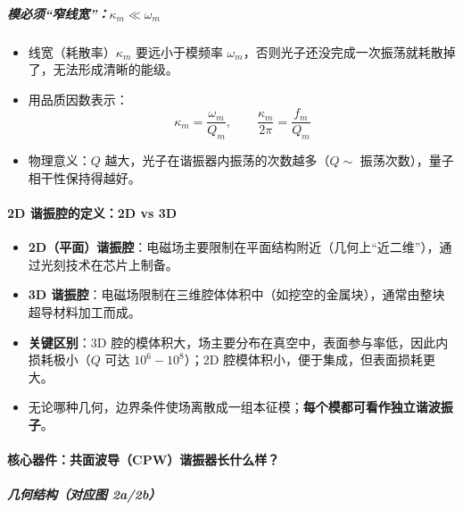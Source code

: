 \documentclass[12pt,a4paper,oneside]{ctexbook}
\providecommand{\tightlist}{%
  \setlength{\itemsep}{0pt}\setlength{\parskip}{0pt}}
\let\oldparagraph\paragraph
\renewcommand{\paragraph}[1]{\oldparagraph{#1}\mbox{}}
\let\oldsubparagraph\subparagraph
\renewcommand{\subparagraph}[1]{\oldsubparagraph{#1}\mbox{}}
\begin{document}
\subparagraph{\texorpdfstring{
模必须``窄线宽''：\(\kappa_m \ll \omega_m\)}{2.2 模必须``窄线宽''：\textbackslash{}kappa\_m \textbackslash{}ll \textbackslash{}omega\_m}}\label{ux6a21ux5fc5ux987bux7a84ux7ebfux5bbdkappa_m-ll-omega_m}

\begin{itemize}
\tightlist
\item
  线宽（耗散率）\(\kappa_m\) 要远小于模频率
  \(\omega_m\)，否则光子还没完成一次振荡就耗散掉了，无法形成清晰的能级。
\item
  用品质因数表示：
  \[\kappa_m=\frac{\omega_m}{Q_m},\qquad \frac{\kappa_m}{2\pi}=\frac{f_m}{Q_m}\]
\item
  物理意义：\(Q\) 越大，光子在谐振器内振荡的次数越多（\(Q \sim\)
  振荡次数），量子相干性保持得越好。
\end{itemize}


\paragraph{2D 谐振腔的定义：2D vs
3D}\label{d-ux8c10ux632fux8154ux7684ux5b9aux4e492d-vs-3d}

\begin{itemize}
\tightlist
\item
  \textbf{2D（平面）谐振腔}：电磁场主要限制在平面结构附近（几何上``近二维''），通过光刻技术在芯片上制备。
\item
  \textbf{3D
  谐振腔}：电磁场限制在三维腔体体积中（如挖空的金属块），通常由整块超导材料加工而成。
\item
  \textbf{关键区别}：3D
  腔的模体积大，场主要分布在真空中，表面参与率低，因此内损耗极小（\(Q\)
  可达 \(10^6-10^8\)）；2D 腔模体积小，便于集成，但表面损耗更大。
\item
  无论哪种几何，边界条件使场离散成一组本征模；\textbf{每个模都可看作独立谐波振子}。
\end{itemize}


\paragraph{
核心器件：共面波导（CPW）谐振器长什么样？}\label{ux6838ux5fc3ux5668ux4ef6ux5171ux9762ux6ce2ux5bfccpwux8c10ux632fux5668ux957fux4ec0ux4e48ux6837}

\subparagraph{几何结构（对应图
2a/2b）}\label{ux51e0ux4f55ux7ed3ux6784ux5bf9ux5e94ux56fe-2a2b}
\end{document}

